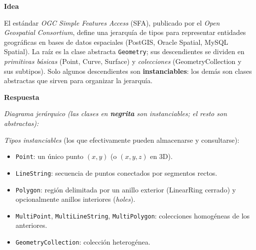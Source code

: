 \documentclass[11pt,a4paper]{article}
\newcommand{\itemcabecera}[1]{\noindent\textbf{#1}\par\medskip}
\newcommand{\bloqueIdea}{\itemcabecera{Idea}}
\newcommand{\bloqueRespuesta}{\itemcabecera{Respuesta}}
\begin{document}
\bloqueIdea

El estándar \emph{OGC Simple Features Access} (SFA), publicado por el \emph{Open Geospatial Consortium}, define una jerarquía de tipos para representar entidades geográficas en bases de datos espaciales (PostGIS, Oracle Spatial, MySQL Spatial). La raíz es la clase abstracta \texttt{Geometry}; sus descendientes se dividen en \emph{primitivas básicas} (Point, Curve, Surface) y \emph{colecciones} (GeometryCollection y sus subtipos). Solo algunos descendientes son \textbf{instanciables}: los demás son clases abstractas que sirven para organizar la jerarquía.

\bloqueRespuesta

\textit{Diagrama jerárquico (las clases en \textbf{negrita} son instanciables; el resto son abstractas):}

\begin{center}
\end{center}

\textit{Tipos instanciables} (los que efectivamente pueden almacenarse y consultarse):

\begin{itemize}
    \item \texttt{Point}: un único punto $(x, y)$ (o $(x, y, z)$ en 3D).
    \item \texttt{LineString}: secuencia de puntos conectados por segmentos rectos.
    \item \texttt{Polygon}: región delimitada por un anillo exterior (LinearRing cerrado) y opcionalmente anillos interiores (\emph{holes}).
    \item \texttt{MultiPoint}, \texttt{MultiLineString}, \texttt{MultiPolygon}: colecciones homogéneas de los anteriores.
    \item \texttt{GeometryCollection}: colección heterogénea.
\end{itemize}
\end{document}
